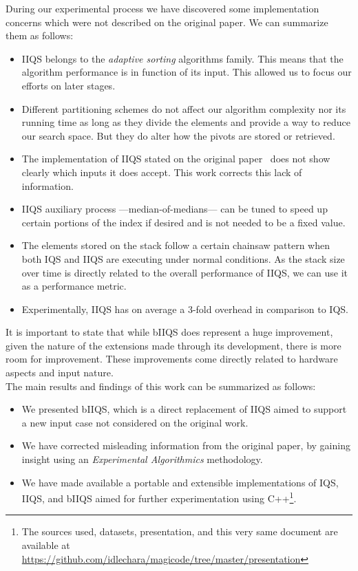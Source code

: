 During our experimental process we have discovered some implementation concerns which were not described on the original paper. We can summarize them as follows:

\begin{itemize}
    \item IIQS belongs to the \emph{adaptive sorting} algorithms family. This means that the algorithm performance is in function of its input. This allowed us to focus our efforts on later stages.
    \item Different partitioning schemes do not affect our algorithm complexity nor its running time as long as they divide the elements and provide a way to reduce our search space. But they do alter how the pivots are stored or retrieved.
    \item The implementation of IIQS stated on the original paper~\cite{7416566} does not show clearly which inputs it does accept. This work corrects this lack of information.
    \item IIQS auxiliary process ---median-of-medians--- can be tuned to speed up certain portions of the index if desired and is not needed to be a fixed value.
    \item The elements stored on the stack follow a certain chainsaw pattern when both IQS and IIQS are executing under normal conditions. As the stack size over time is directly related to the overall performance of IIQS, we can use it as a performance metric.
    \item Experimentally, IIQS has on average a 3-fold overhead in comparison to IQS.
\end{itemize}


It is important to state that while bIIQS does represent a huge improvement, given the nature of the extensions made through its development, there is more room for improvement. These improvements come directly related to hardware aspects and input nature.\\

The main results and findings of this work can be summarized as follows:
\begin{itemize}
    \item We presented bIIQS, which is a direct replacement of IIQS aimed to support a new input case not considered on the original work.
    \item We have corrected misleading information from the original paper, by gaining insight using an \emph{Experimental Algorithmics} methodology.
    \item We have made available a portable and extensible implementations of IQS, IIQS, and bIIQS aimed for further experimentation using C++\footnote{The sources used, datasets, presentation, and this very same document are available at \href{https://github.com/idlechara/magicode/tree/master/presentation}{https://github.com/idlechara/magicode/tree/master/presentation} }.
\end{itemize}

